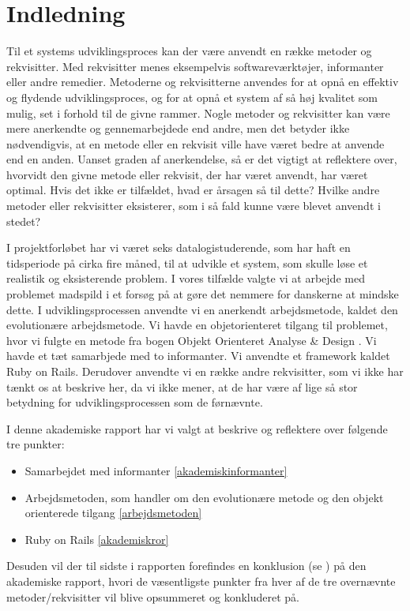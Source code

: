 \chapter{Indledning}

Til et systems udviklingsproces kan der være anvendt en række metoder og rekvisitter. Med rekvisitter menes eksempelvis softwareværktøjer, informanter eller andre remedier. Metoderne og rekvisitterne anvendes for at opnå en effektiv og flydende udviklingsproces, og for at opnå et system af så høj kvalitet som mulig, set i forhold til de givne rammer. Nogle metoder og rekvisitter kan være mere anerkendte og gennemarbejdede end andre, men det betyder ikke nødvendigvis, at en metode eller en rekvisit ville have været bedre at anvende end en anden. Uanset graden af anerkendelse, så er det vigtigt at reflektere over, hvorvidt den givne metode eller rekvisit, der har været anvendt, har været optimal. Hvis det ikke er tilfældet, hvad er årsagen så til dette? Hvilke andre metoder eller rekvisitter eksisterer, som i så fald kunne være blevet anvendt i stedet?

I projektforløbet har vi været seks datalogistuderende, som har haft en tidsperiode på cirka fire måned, til at udvikle et system, som skulle løse et realistik og eksisterende problem. I vores tilfælde valgte vi at arbejde med problemet madspild i et forsøg på at gøre det nemmere for danskerne at mindske dette. I udviklingsprocessen anvendte vi en anerkendt arbejdsmetode, kaldet den evolutionære arbejdsmetode. Vi havde en objetorienteret tilgang til problemet, hvor vi fulgte en metode fra bogen Objekt Orienteret Analyse & Design \cite{ooad}. Vi havde et tæt samarbjede med to informanter. Vi anvendte et framework kaldet Ruby on Rails. Derudover anvendte vi en række andre rekvisitter, som vi ikke har tænkt os at beskrive her, da vi ikke mener, at de har være af lige så stor betydning for udviklingsprocessen som de førnævnte.

I denne akademiske rapport har vi valgt at beskrive og reflektere over følgende tre punkter:

\begin{itemize}[noitemsep]
  \item Samarbejdet med informanter \ref{akademiskinformanter}
  \item Arbejdsmetoden, som handler om den evolutionære metode og den objekt orienterede tilgang \ref{arbejdsmetoden}
  \item Ruby on Rails \ref{akademiskror}
\end{itemize}

Desuden vil der til sidste i rapporten forefindes en konklusion (se ) på den akademiske rapport, hvori de væsentligste punkter fra hver af de tre overnævnte metoder/rekvisitter vil blive opsummeret og konkluderet på.

